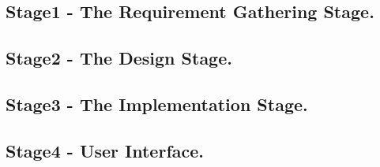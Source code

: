 \documentclass[10pt,conference]{IEEEtran}
\begin{document}
%
\subsection{Stage1 - The Requirement Gathering Stage. }\label{sec:1 Requirement Gathering Stage. }


\subsection{Stage2 - The Design Stage. }\label{sec: 2:The Design Stage.}


\subsection{Stage3 - The Implementation Stage. }\label{sec: 3 The Implementation Stage.}


\subsection{Stage4 -	User Interface. }\label{sec: 4. User Interface.}


%
\end{document}
